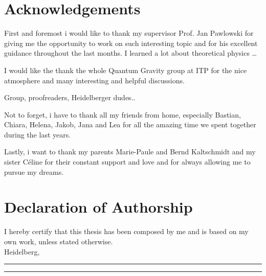 \thispagestyle{plain}
\section*{Acknowledgements}
First and foremost i would like to thank my supervisor Prof. Jan Pawlowski for giving me the opportunity to work on such interesting topic and for his excellent guidance throughout the last months. I learned a lot about theoretical physics \dots

I would like the thank the whole Quantum Gravity group at ITP for the nice atmosphere and many interesting and  helpful discussions. 

Group, proofreaders, Heidelberger dudes..


Not to forget, i have to thank all my friends from home, especially Bastian, Chiara, Helena, Jakob, Jana and Lea for all the amazing time we spent together during the last years. 

Lastly, i want to thank my parents Marie-Paule and Bernd Kaltschmidt and my sister C\'{e}line for their constant support and love and for always allowing me to pursue my dreams.  
 

\section*{Declaration of Authorship}
I hereby certify that this thesis has been composed by me and is based on my own work, unless stated otherwise.\\

Heidelberg, \rule{30mm}{.15mm} \hfill \rule{50mm}{.15mm} \par


